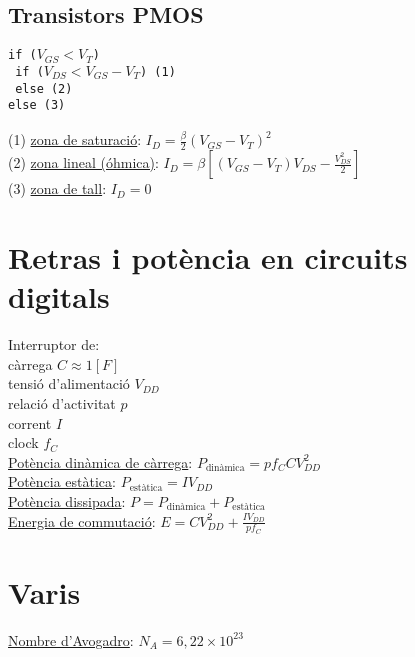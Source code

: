 \documentclass[10pt]{article}
\begin{document}
\begin{multicols}{5}
\subsection{Transistors PMOS}

\texttt{if ($V_{GS} < V_T$) }\\
\texttt{ if ($V_{DS} < V_{GS} - V_T$) (1)} \\
\texttt{ else (2)} \\
\texttt{else (3)} \\
\texttt{ } \\
(1) \underline{zona de saturació}: $I_D = \frac{\beta}{2} (V_{GS}-V_T)^2$ \\
(2) \underline{zona lineal (óhmica)}: $I_D = \beta \left[ \left( V_{GS} - V_T \right) V_{DS} - \frac{V_{DS}^2}{2} \right]$ \\
(3) \underline{zona de tall}: $I_D = 0$

\section{Retras i potència en circuits digitals}

Interruptor de: \\
\qquad càrrega $C \approx 1 [F]$ \\
\qquad tensió d'alimentació $V_{DD}$ \\
\qquad relació d'activitat $p$ \\
\qquad corrent $I$ \\
\qquad clock $f_C$ \\
\underline{Potència dinàmica de càrrega}: $P_{\text{dinàmica}} = p f_C C V_{DD}^2$ \\
\underline{Potència estàtica}: $P_{\text{estàtica}} = I V_{DD}$ \\
\underline{Potència dissipada}: $P = P_{\text{dinàmica}} + P_{\text{estàtica}}$ \\
\underline{Energia de commutació}: $E = C V_{DD}^2 + \frac{I V_{DD}}{p f_C}$

\section{Varis}

\underline{Nombre d'Avogadro}: $N_A = 6,22 \times 10^{23}$ \\

\end{multicols}
\end{document}

